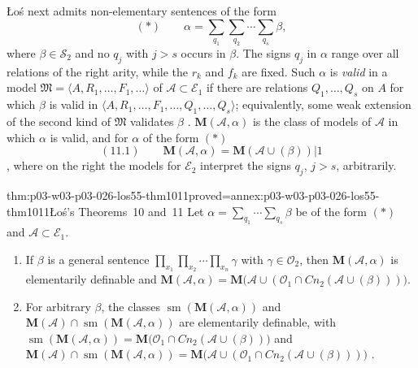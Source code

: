 \L o\'s next admits non-elementary sentences of the form
\begin{equation*}
 (*)\qquad \alpha=\sum_{q_1}\sum_{q_2}\cdots\sum_{q_s}\beta ,
\end{equation*}
where \(\beta\in\mathcal S_2\) and no \(q_j\) with \(j>s\) occurs in
\(\beta\).  The signs \(q_j\) in \(\alpha\) range over all relations of the
right arity, while the \(r_k\) and \(f_k\) are fixed.  Such \(\alpha\) is
\emph{valid} in a model
\(\mathfrak M=\langle A,R_1,\ldots,F_1,\ldots\rangle\) of
\(\mathcal A\subset\mathcal E_1\) if there are relations
\(Q_1,\ldots,Q_s\) on \(A\) for which \(\beta\) is valid in
\(\langle A,R_1,\ldots,F_1,\ldots,Q_1,\ldots,Q_s\rangle\); equivalently,
some weak extension of the second kind of \(\mathfrak M\) validates
\(\beta\) \cite[p.~49]{Los1955}.  \(\mathbf M(\mathcal A,\alpha)\) is the class
of models of \(\mathcal A\) in which \(\alpha\) is valid, and for \(\alpha\) of
the form \((*)\)
\begin{equation*}
 (11.1)\qquad \mathbf M(\mathcal A,\alpha)=\mathbf M(\mathcal A\cup(\beta))|1
\end{equation*}
\cite[p.~50]{Los1955}, where on the right the models for \(\mathcal E_2\)
interpret the signs \(q_j\), \(j>s\), arbitrarily.

\begin{hbtheorem}{thm:p03-w03-p03-026-los55-thm1011}{proved=annex:p03-w03-p03-026-los55-thm1011}{\L o\'s's Theorems~10 and~11}
Let \(\alpha=\sum_{q_1}\cdots\sum_{q_s}\beta\) be of the form \((*)\) and
\(\mathcal A\subset\mathcal E_1\).
\begin{enumerate}
 \item[(Theorem~10)] If \(\beta\) is a general sentence
       \(\prod_{x_1}\prod_{x_2}\cdots\prod_{x_n}\gamma\) with
       \(\gamma\in\mathcal O_2\), then \(\mathbf M(\mathcal A,\alpha)\) is
       elementarily definable and
       \(\mathbf M(\mathcal A,\alpha)=\mathbf M\bigl(\mathcal A\cup(\mathcal O_1\cap\mathit{Cn}_2(\mathcal A\cup(\beta)))\bigr)\).
 \item[(Theorem~11)] For arbitrary \(\beta\), the classes
       \(\operatorname{sm}(\mathbf M(\mathcal A,\alpha))\) and
       \(\mathbf M(\mathcal A)\cap\operatorname{sm}(\mathbf M(\mathcal A,\alpha))\)
       are elementarily definable, with
       \(\operatorname{sm}(\mathbf M(\mathcal A,\alpha))=\mathbf M\bigl(\mathcal O_1\cap\mathit{Cn}_2(\mathcal A\cup(\beta))\bigr)\)
       and
       \(\mathbf M(\mathcal A)\cap\operatorname{sm}(\mathbf M(\mathcal A,\alpha))=\mathbf M\bigl(\mathcal A\cup(\mathcal O_1\cap\mathit{Cn}_2(\mathcal A\cup(\beta)))\bigr)\)
       \cite[p.~50]{Los1955}.
\end{enumerate}
\end{hbtheorem}

